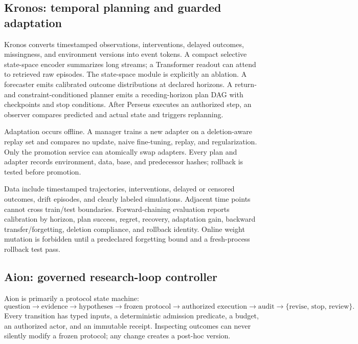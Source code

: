 \documentclass[10pt]{article}
\begin{document}
\subsection{Kronos: temporal planning and guarded adaptation}

Kronos converts timestamped observations, interventions, delayed outcomes,
missingness, and environment versions into event tokens. A compact selective
state-space encoder summarizes long streams; a Transformer readout can attend
to retrieved raw episodes. The state-space module is explicitly an ablation. A
forecaster emits calibrated outcome distributions at declared horizons. A
return- and constraint-conditioned planner emits a receding-horizon plan DAG
with checkpoints and stop conditions. After Perseus executes an authorized
step, an observer compares predicted and actual state and triggers replanning.

Adaptation occurs offline. A manager trains a new adapter on a deletion-aware
replay set and compares no update, naive fine-tuning, replay, and regularization.
Only the promotion service can atomically swap adapters. Every plan and adapter
records environment, data, base, and predecessor hashes; rollback is tested
before promotion.

Data include timestamped trajectories, interventions, delayed or censored
outcomes, drift episodes, and clearly labeled simulations. Adjacent time points
cannot cross train/test boundaries. Forward-chaining evaluation reports
calibration by horizon, plan success, regret, recovery, adaptation gain,
backward transfer/forgetting, deletion compliance, and rollback identity.
Online weight mutation is forbidden until a predeclared forgetting bound and a
fresh-process rollback test pass.

\subsection{Aion: governed research-loop controller}

Aion is primarily a protocol state machine:
\begin{equation}
\text{question}\rightarrow\text{evidence}\rightarrow\text{hypotheses}
\rightarrow\text{frozen protocol}\rightarrow\text{authorized execution}
\rightarrow\text{audit}\rightarrow\{\text{revise, stop, review}\}.
\end{equation}
Every transition has typed inputs, a deterministic admission predicate, a
budget, an authorized actor, and an immutable receipt. Inspecting outcomes can
never silently modify a frozen protocol; any change creates a post-hoc version.
\end{document}
